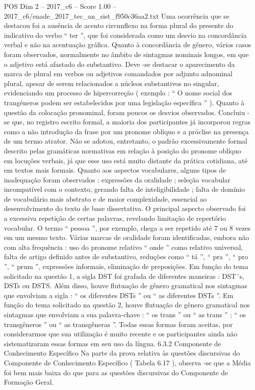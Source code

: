 \begin{textsample}{POS Dim 2 – 2017\_c6 – Score 1.00 – 2017\_c6/enade\_2017\_tec\_an\_sist\_f950c36aa2.txt}
Uma ocorrência que se destacou foi a ausência de acento circunflexo na forma plural do presente do indicativo do verbo “ ter ”, que foi considerada como um desvio na concordância verbal e não na acentuação gráfica.
Quanto à concordância de gênero, vários casos foram observados, normalmente no âmbito de sintagmas nominais longos, em que o adjetivo está afastado do substantivo.
Deve -se destacar o aparecimento da marca de plural em verbos ou adjetivos comandados por adjunto adnominal plural, apesar de serem relacionados a núcleos substantivos no singular, evidenciando um processo de hipercorreção ( exemplo : “ O nome social dos trangêneros podem ser estabelecidos por uma legislação específica ” ).
Quanto à questão da colocação pronominal, foram poucos os desvios observados.
Concluiu -se que, no registro escrito formal, a maioria dos participantes já incorporou regras como a não introdução da frase por um pronome oblíquo e a próclise na presença de um termo atrator.
Não se adotou, entretanto, o padrão excessivamente formal descrito pelas gramáticas normativas em relação à posição do pronome oblíquo em locuções verbais, já que esse uso está muito distante da prática cotidiana, até em textos mais formais.
Quanto aos aspectos vocabulares, alguns tipos de inadequação foram observados : expressões da oralidade ; seleção vocabular incompatível com o contexto, gerando falta de inteligibilidade ; falta de domínio de vocabulário mais abstrato e de maior complexidade, essencial ao desenvolvimento do texto de base dissertativa.
O principal aspecto observado foi a excessiva repetição de certas palavras, revelando limitação de repertório vocabular.
O termo “ pessoa ”, por exemplo, chega a ser repetido até 7 ou 8 vezes em um mesmo texto.
Várias marcas de oralidade foram identificadas, embora não com alta frequência : uso do pronome relativo “ onde ” como relativo universal, falta de artigo definido antes de substantivo, reduções como “ tá ”, “ pra ”, “ pro ”, “ prum ”, expressões informais, eliminação de preposições.
Em função do tema solicitado na questão 1, a sigla DST foi grafada de diferentes maneiras : DST´s, DSTs ou DSTS.
Além disso, houve flutuação de gênero gramatical nos sintagmas que envolviam a sigla : “ os diferentes DSTs ” ou “ as diferentes DSTs ”.
Em função do tema solicitado na questão 2, houve flutuação de gênero gramatical nos sintagmas que envolviam a sua palavra-chave : “ os trans ” ou “ as trans ” ; “ os transgêneros ” ou “ as transgêneras ”.
Todas essas formas foram aceitas, por considerarmos que sua utilização é muito recente e os participantes ainda não sistematizaram essas formas em seu uso da língua. 6.3.2 Componente de Conhecimento Específico Na parte da prova relativa às questões discursivas do Componente de Conhecimento Específico ( Tabela 6.17 ), observa -se que a Média foi bem mais baixa do que para as questões discursivas do Componente de Formação Geral.

\end{textsample}
